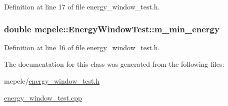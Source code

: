 \-Definition at line 17 of file energy\-\_\-window\-\_\-test.\-h.

\hypertarget{classmcpele_1_1EnergyWindowTest_abb86cad9952f92fd8db221baaf62e847}{
\subsubsection[{m\-\_\-min\-\_\-energy}]{\setlength{\rightskip}{0pt plus 5cm}double {\bf mcpele\-::\-Energy\-Window\-Test\-::m\-\_\-min\-\_\-energy}}}\label{classmcpele_1_1EnergyWindowTest_abb86cad9952f92fd8db221baaf62e847}


\-Definition at line 16 of file energy\-\_\-window\-\_\-test.\-h.



\-The documentation for this class was generated from the following files\-:\begin{DoxyCompactItemize}
\item 
mcpele/\hyperlink{energy__window__test_8h}{energy\-\_\-window\-\_\-test.\-h}\item 
\hyperlink{energy__window__test_8cpp}{energy\-\_\-window\-\_\-test.\-cpp}\end{DoxyCompactItemize}
